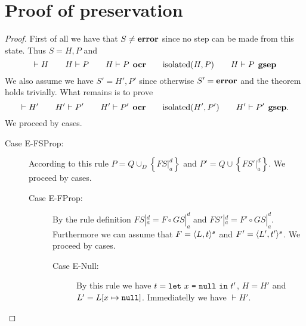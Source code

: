 \section{Proof of preservation}
\label{sec:proof_of_preservation}

\begin{proof} 
  First of all we have that $S \neq \mbox{{\bf error}}$ since no step can be made from this
  state. Thus $S = H, P$ and
  \begin{equation*}
    \vdash H \quad\quad H \vdash P \quad\quad H \vdash P \:\: \mbox{\bf ocr} \quad\quad
    \mbox{$\mathrm{isolated}$}{(H, P)} \quad\quad H \vdash P \:\: \mbox{\bf gsep}
  \end{equation*}
  We also assume we have $S' = H', P'$ since otherwise $S' = \mbox{{\bf error}}$ and the
  theorem holds trivially. What remains is to prove
  \begin{equation*}
    \vdash H' \quad\quad H' \vdash P' \quad\quad H' \vdash P' \:\: \mbox{\bf ocr} \quad\quad
    \mbox{$\mathrm{isolated}$}{(H', P')} \quad\quad H' \vdash P' \:\: \mbox{\bf gsep}.
  \end{equation*}
  We proceed by cases.
  \begin{description}
    \item[Case {\sc E-FSProp}:] According to this rule $P = Q \cup_D \left\{
        FS|_a^d \right\}$ and $P' = Q \cup \left\{ FS'|_a^d \right\}$. We proceed by cases.
      \begin{description}
        \item[Case {\sc E-FProp}:] By the rule definition $FS|_a^d = F \circ
          GS|_a^d$ and $FS'|_a^d = F' \circ GS|_a^d$. Furthermore we can assume
          that $F = \mbox{$\langle L, t \rangle^s$}$ and $F' = \mbox{$\langle L', t' \rangle^s$}$.
          We proceed by cases.
          \begin{description}
            \item[Case {\sc E-Null}:] By this rule we have $t =
              \mbox{\texttt{let}~$x$~\texttt{=}~$\mbox{\texttt{null}}$~\texttt{in}~$t'$}$, $H = H'$ and $L' = L[x \mapsto \mbox{\texttt{null}}]$.
              Immediatelly we have $\vdash H'$.


\end{description}
\end{description}
\end{description}
\end{proof}
